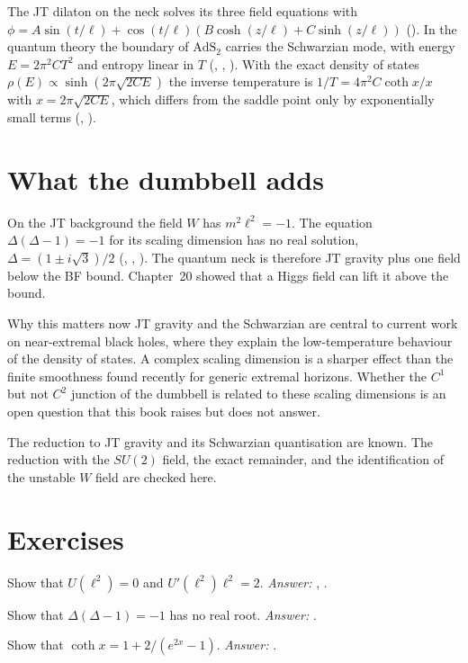 The JT dilaton on the neck solves its three field equations with $\phi=A\sin(t/\ell)+\cos(t/\ell)(B\cosh(z/\ell)+C\sinh(z/\ell))$ (). In the quantum theory the boundary of $\mathrm{AdS}_2$ carries the Schwarzian mode, with energy $E=2\pi^2CT^2$ and entropy linear in $T$ (, , ). With the exact density of states $\rho(E)\propto\sinh(2\pi\sqrt{2CE})$ the inverse temperature is $1/T=4\pi^2C\coth x/x$ with $x=2\pi\sqrt{2CE}$, which differs from the saddle point only by exponentially small terms (, ).

\section{What the dumbbell adds}

On the JT background the field $W$ has $m^2\ell^2=-1$. The equation $\Delta(\Delta-1)=-1$ for its scaling dimension has no real solution, $\Delta=(1\pm i\sqrt3)/2$ (, , ). The quantum neck is therefore JT gravity plus one field below the BF bound. Chapter~20 showed that a Higgs field can lift it above the bound.

\begin{asidebox}{Why this matters now}
JT gravity and the Schwarzian are central to current work on near-extremal black holes, where they explain the low-temperature behaviour of the density of states. A complex scaling dimension is a sharper effect than the finite smoothness found recently for generic extremal horizons. Whether the $C^1$ but not $C^2$ junction of the dumbbell is related to these scaling dimensions is an open question that this book raises but does not answer.
\end{asidebox}

\begin{standsbox}
The reduction to JT gravity and its Schwarzian quantisation are known. The reduction with the $SU(2)$ field, the exact remainder, and the identification of the unstable $W$ field are checked here.
\end{standsbox}

\section*{Exercises}
\begin{exercise}Show that $U(\ell^2)=0$ and $U'(\ell^2)\ell^2=2$. \emph{Answer:} , .\end{exercise}
\begin{exercise}Show that $\Delta(\Delta-1)=-1$ has no real root. \emph{Answer:} .\end{exercise}
\begin{exercise}Show that $\coth x=1+2/(e^{2x}-1)$. \emph{Answer:} .\end{exercise}
